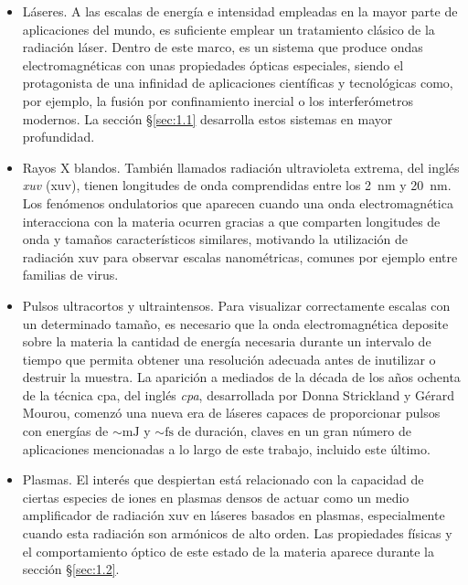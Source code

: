 \begin{itemize}
    \item Láseres. A las escalas de energía e intensidad empleadas en la mayor parte de aplicaciones del mundo, es suficiente emplear un tratamiento clásico de la radiación láser. Dentro de este marco, es un sistema que produce ondas electromagnéticas con unas propiedades ópticas especiales, siendo el protagonista de una infinidad de aplicaciones científicas y tecnológicas como, por ejemplo, la fusión por confinamiento inercial o los interferómetros modernos. La sección \S\ref{sec:1.1} desarrolla estos sistemas en mayor profundidad.
    \item Rayos X blandos. También llamados radiación ultravioleta extrema, del inglés \emph{\acrlong{xuv}} (\acrshort{xuv}), tienen longitudes de onda comprendidas entre los \qty{2}{\nm} y \qty{20}{\nm}. Los fenómenos ondulatorios que aparecen cuando una onda electromagnética interacciona con la materia ocurren gracias a que comparten longitudes de onda y tamaños característicos similares, motivando la utilización de radiación \acrshort{xuv} para observar escalas nanométricas, comunes por ejemplo entre familias de virus.
    \item Pulsos ultracortos y ultraintensos. Para visualizar correctamente escalas con un determinado tamaño, es necesario que la onda electromagnética deposite sobre la materia la cantidad de energía necesaria durante un intervalo de tiempo que permita obtener una resolución adecuada antes de inutilizar o destruir la muestra. La aparición a mediados de la década de los años ochenta de la técnica \acrshort{cpa}, del inglés \emph{\acrlong{cpa}}, desarrollada por Donna Strickland y Gérard Mourou\autocite{Strickland1985}, comenzó una nueva era de láseres capaces de proporcionar pulsos con energías de $\sim\unit{\mJ}$ y $\sim\unit{\fs}$ de duración, claves en un gran número de aplicaciones mencionadas a lo largo de este trabajo, incluido este último.
    \item Plasmas. El interés que despiertan está relacionado con la capacidad de ciertas especies de iones en plasmas densos de actuar como un medio amplificador de radiación \acrshort{xuv} en láseres basados en plasmas, especialmente cuando esta radiación son armónicos de alto orden. Las propiedades físicas y el comportamiento óptico de este estado de la materia aparece durante la sección \S\ref{sec:1.2}. 

\end{itemize}
